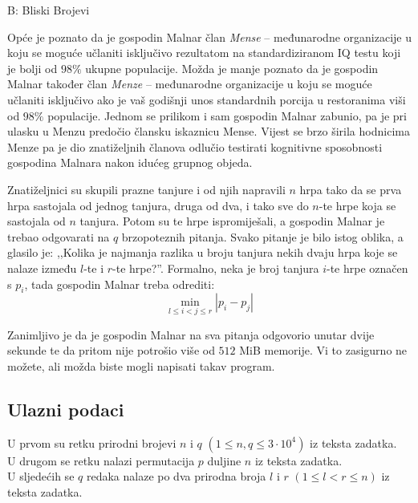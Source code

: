 \begin{statement}[
  timelimit=2 s,
  memorylimit=512 MiB,
]{B: Bliski Brojevi}

Opće je poznato da je gospodin Malnar član \textit{Mense} -- međunarodne
organizacije u koju se moguće učlaniti isključivo rezultatom na standardiziranom
IQ testu koji je bolji od $98\%$ ukupne populacije. Možda je manje poznato da je
gospodin Malnar također član \textit{Menze} -- međunarodne organizacije u koju
se moguće učlaniti isključivo ako je vaš godišnji unos standardnih porcija u
restoranima viši od $98\%$ populacije. Jednom se prilikom i sam gospodin Malnar
zabunio, pa je pri ulasku u Menzu predočio člansku iskaznicu Mense. Vijest se
brzo širila hodnicima Menze pa je dio znatiželjnih članova odlučio testirati
kognitivne sposobnosti gospodina Malnara nakon idućeg grupnog objeda.

Znatiželjnici su skupili prazne tanjure i od njih napravili $n$ hrpa tako
da se prva hrpa sastojala od jednog tanjura, druga od dva, i tako sve do
$n$-te hrpe koja se sastojala od $n$ tanjura. Potom su te hrpe ispromiješali, a
gospodin Malnar je trebao odgovarati na $q$ brzopoteznih pitanja. Svako pitanje
je bilo istog oblika, a glasilo je: ,,Kolika je najmanja razlika u broju tanjura
nekih dvaju hrpa koje se nalaze između $l$-te i $r$-te hrpe?''. Formalno, neka
je broj tanjura $i$-te hrpe označen s $p_i$, tada gospodin Malnar treba odrediti:
$$\min_{l \le i < j \le r}{|p_i - p_j|}$$

Zanimljivo je da je gospodin Malnar na sva pitanja odgovorio unutar dvije
sekunde te da pritom nije potrošio više od $512$ MiB memorije. Vi to
zasigurno ne možete, ali možda biste mogli napisati takav program.

\subsection*{Ulazni podaci}
U prvom su retku prirodni brojevi $n$ i $q$ $(1 \le n, q \le 3 \cdot 10^4)$ iz
teksta zadatka.\\
U drugom se retku nalazi permutacija $p$ duljine $n$ iz teksta zadatka.\\
U sljedećih se $q$ redaka nalaze po dva prirodna broja $l$ i $r$
$(1 \le l < r \le n)$ iz teksta zadatka.


\end{statement}
